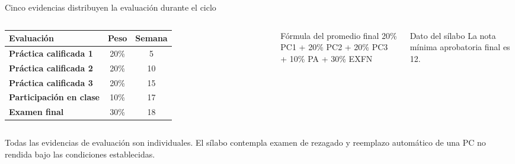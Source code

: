 \documentclass[aspectratio=169,10pt,c]{beamer}
\begin{document}
\begin{frame}{Cinco evidencias distribuyen la evaluación durante el ciclo}
\begin{columns}[T,onlytextwidth]
\small
\begin{tabular}{>{\bfseries}p{3.35cm}cc}
\toprule
Evaluación & Peso & Semana\\
\midrule
Práctica calificada 1 & 20\% & 5\\
Práctica calificada 2 & 20\% & 10\\
Práctica calificada 3 & 20\% & 15\\
Participación en clase & 10\% & 17\\
Examen final & 30\% & 18\\
\bottomrule
\end{tabular}
\begin{block}{Fórmula del promedio final}
\centering\small
20\% PC1 + 20\% PC2 + 20\% PC3\\
+ 10\% PA + 30\% EXFN
\end{block}
\begin{alertblock}{Dato del sílabo}
\small La nota mínima aprobatoria final es 12.
\end{alertblock}
\end{columns}
\vspace{0.25cm}
\small Todas las evidencias de evaluación son individuales. El sílabo contempla examen de rezagado y reemplazo automático de una PC no rendida bajo las condiciones establecidas.
\end{frame}
\end{document}
